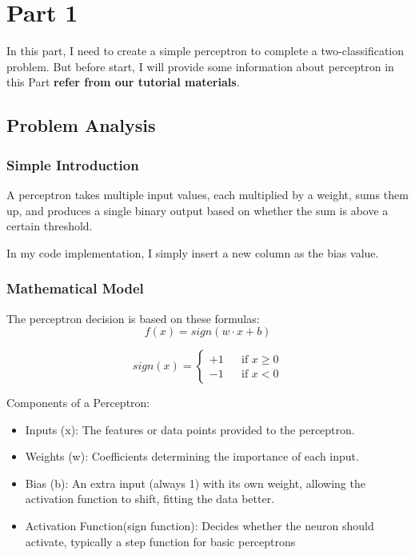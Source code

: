 \section{Part 1}

In this part, I need to create a simple perceptron to complete a two-classification problem.
But before start, I will provide some information about perceptron in this Part
\textbf{refer from our tutorial materials}.

\subsection{Problem Analysis}

\subsubsection{Simple Introduction}

A perceptron takes multiple input values, each multiplied by a weight, sums them up,
and produces a single binary output based on whether the sum is above a certain threshold.

In my code implementation, I simply insert a new column as the bias value.


\subsubsection{Mathematical Model}

The perceptron decision is based on these formulas:
$$
  f(x) = sign(w\cdot x+b)
$$

$$
sign(x)=
\left\{
  \begin{aligned}
    +1 && \text{if $x \geq 0$}\\
    -1 && \text{if $x < 0$}
  \end{aligned}
\right.
$$

Components of a Perceptron:

\begin{itemize}
  \item Inputs (x): The features or data points provided to the perceptron.
  \item Weights (w): Coefficients determining the importance of each input.
  \item {Bias (b):
      An extra input (always 1) with its own weight, allowing the activation function to shift, fitting the data better.
    }
  \item {Activation Function(sign function):
      Decides whether the neuron should activate, typically a step function for basic perceptrons
    }
\end{itemize}

